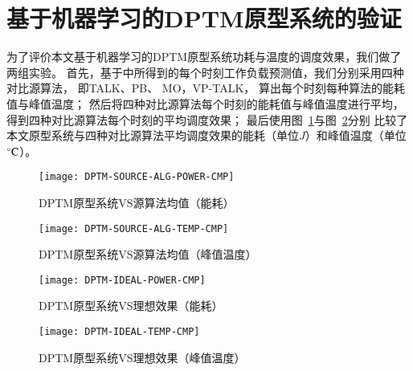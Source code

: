 \section{基于机器学习的DPTM原型系统的验证}
为了评价本文基于机器学习的DPTM原型系统功耗与温度的调度效果，我们做了两组实验。
首先，基于中所得到的每个时刻工作负载预测值，我们分别采用四种对比源算法， 即TALK、PB、 MO，VP-TALK， 算出每个时刻每种算法的能耗值与峰值温度； 然后将四种对比源算法每个时刻的能耗值与峰值温度进行平均，得到四种对比源算法每个时刻的平均调度效果； 最后使用图~\ref{fig:dptm-source-alg-power-cmp}与图~\ref{fig:dptm-source-alg-temp-cmp}分别 比较了本文原型系统与四种对比源算法平均调度效果的能耗（单位$J$）和峰值温度（单位$\celsius$）。
\begin{figure}[H]
  \centering
  \texttt{[image: DPTM-SOURCE-ALG-POWER-CMP]}
  \caption{DPTM原型系统VS源算法均值（能耗）}
  \label{fig:dptm-source-alg-power-cmp}
\end{figure}
\begin{figure}[H]
  \centering
  \texttt{[image: DPTM-SOURCE-ALG-TEMP-CMP]}
  \caption{DPTM原型系统VS源算法均值（峰值温度）}
  \label{fig:dptm-source-alg-temp-cmp}
\end{figure}
\begin{figure}[H]
  \centering
  \texttt{[image: DPTM-IDEAL-POWER-CMP]}
  \caption{DPTM原型系统VS理想效果（能耗）}
  \label{fig:dptm-ideal-power-cmp}
\end{figure}
\begin{figure}[H]
  \centering
  \texttt{[image: DPTM-IDEAL-TEMP-CMP]}
  \caption{DPTM原型系统VS理想效果（峰值温度）}
  \label{fig:dptm-ideal-temp-cmp}
\end{figure}

